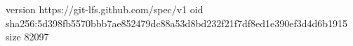 version https://git-lfs.github.com/spec/v1
oid sha256:5d398fb5570bbb7ae852479dc88a53d8bd232f21f7df8ed1e390ef3d4d6b1915
size 82097
